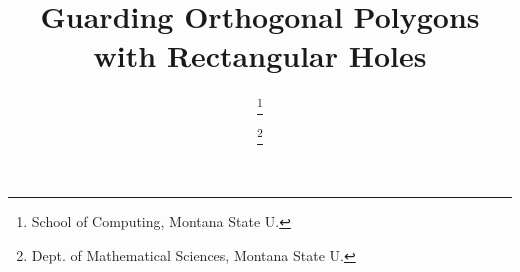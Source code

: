 \documentclass[11pt]{article}
\title{\vspace{-5ex}Guarding Orthogonal Polygons with Rectangular Holes}
\date{\vspace{-5ex}}
\author{\todo{Authors} \thanks{School of Computing, Montana State U.
} \and \todo{} \thanks{Dept. of Mathematical
    Sciences, Montana State U.     \newline {\scriptsize {\todo{emails}} }} \and
    \todo{author}\footnotemark[2] }
\begin{document}
\thispagestyle{empty}
\maketitle

\begin{abstract}

\end{abstract}




\small{


}
\end{document}
